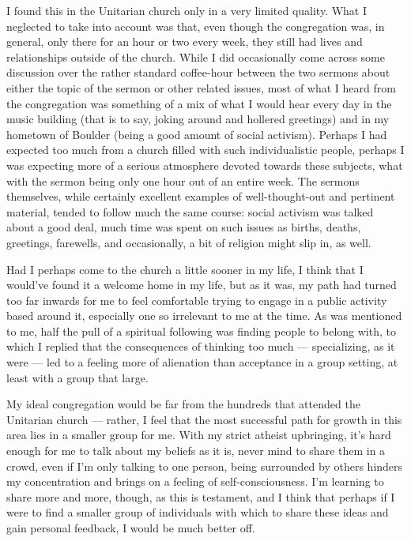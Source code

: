 I found this in the Unitarian church only in a very limited quality. What I neglected to take into account was that, even though the congregation was, in general, only there for an hour or two every week, they still had lives and relationships outside of the church. While I did occasionally come across some discussion over the rather standard coffee-hour between the two sermons about either the topic of the sermon or other related issues, most of what I heard from the congregation was something of a mix of what I would hear every day in the music building (that is to say, joking around and hollered greetings) and in my hometown of Boulder (being a good amount of social activism). Perhaps I had expected too much from a church filled with such individualistic people, perhaps I was expecting more of a serious atmosphere devoted towards these subjects, what with the sermon being only one hour out of an entire week. The sermons themselves, while certainly excellent examples of well-thought-out and pertinent material, tended to follow much the same course: social activism was talked about a good deal, much time was spent on such issues as births, deaths, greetings, farewells, and occasionally, a bit of religion might slip in, as well.

Had I perhaps come to the church a little sooner in my life, I think that I would've found it a welcome home in my life, but as it was, my path had turned too far inwards for me to feel comfortable trying to engage in a public activity based around it, especially one so irrelevant to me at the time. As was mentioned to me, half the pull of a spiritual following was finding people to belong with, to which I replied that the consequences of thinking too much --- specializing, as it were --- led to a feeling more of alienation than acceptance in a group setting, at least with a group that large.

My ideal congregation would be far from the hundreds that attended the Unitarian church --- rather, I feel that the most successful path for growth in this area lies in a smaller group for me. With my strict atheist upbringing, it's hard enough for me to talk about my beliefs as it is, never mind to share them in a crowd, even if I'm only talking to one person, being surrounded by others hinders my concentration and brings on a feeling of self-consciousness. I'm learning to share more and more, though, as this is testament, and I think that perhaps if I were to find a smaller group of individuals with which to share these ideas and gain personal feedback, I would be much better off.


